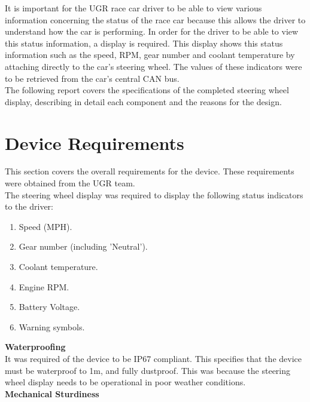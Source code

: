 \documentclass[a4paper,12pt]{article}
\begin{document}
It is important for the UGR race car driver to be able to view various information concerning the status of the race car because this allows the driver to understand how the car is performing. In order for the driver to be able to view this status information, a display is required. This display shows this status information such as the speed, RPM, gear number and coolant temperature by attaching directly to the car’s steering wheel. The values of these indicators were to be retrieved from the car’s central CAN bus. \\

The following report covers the specifications of the completed steering wheel display, describing in detail each component and the reasons for the design.


\newpage
\section{Device Requirements}
\label{sec:device_requirements}

This section covers the overall requirements for the device. These requirements were obtained from the UGR team. \\

The steering wheel display was required to display the following status indicators to the driver:

\begin{enumerate}
  \item Speed (MPH).
  \item Gear number (including 'Neutral').
  \item Coolant temperature.
  \item Engine RPM.
  \item Battery Voltage.
  \item Warning symbols.
\end{enumerate}
\vspace{1cm}

\textbf{Waterproofing} \\

It was required of the device to be IP67 compliant. This specifies that the device must be waterproof to 1m, and fully dustproof. This was because the steering wheel display needs to be operational in poor weather conditions. \\

\textbf{Mechanical Sturdiness} \\
\end{document}
